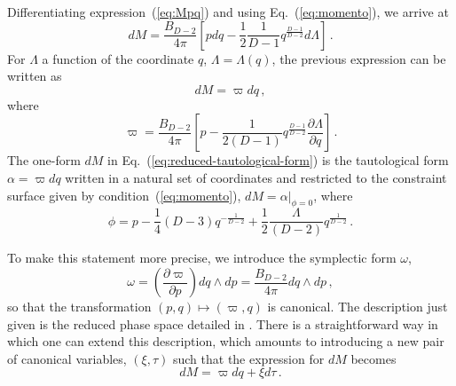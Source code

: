 \documentclass[prd,onecolumn,notitlepage,amsmath,nofootinbib,superscriptaddress,showpacs,showkeys]{revtex4-1}
\begin{document}
Differentiating expression~(\ref{eq:Mpq}) and using Eq.~(\ref{eq:momento}),
we arrive at 
\begin{equation}
dM=\frac{B_{D-2}}{4\pi}\left[pdq-\frac{1}{2}\frac{1}{D-1}q^{\frac{D-1}{D-2}}d\Lambda\right]\,.\label{dm2}
\end{equation}
For $\Lambda$ a function of the coordinate $q$, $\Lambda=\Lambda\left(q\right)$,
the previous expression can be written as 
\begin{equation}
dM=\varpi dq\,,\label{eq:reduced-tautological-form}
\end{equation}
where 
\begin{equation}
\varpi=\frac{B_{D-2}}{4\pi}\left[p-\frac{1}{2\left(D-1\right)}q^{\frac{D-1}{D-2}}\frac{\partial\Lambda}{\partial q}\right]\,.\label{eq:varpi}
\end{equation}
The one-form $dM$ in Eq.~(\ref{eq:reduced-tautological-form}) is
the tautological form $\alpha=\varpi dq$ written in a natural set
of coordinates and restricted to the constraint surface given by condition~(\ref{eq:momento}),
$dM=\left.\alpha\right|_{\phi=0}$, where 
\begin{equation}
\phi=p-\frac{1}{4}\left(D-3\right)q^{-\frac{1}{D-2}}+\frac{1}{2}\frac{\Lambda}{\left(D-2\right)}q^{\frac{1}{D-2}}\,.\label{eq:phi-constraint}
\end{equation}


To make this statement more precise, we introduce the symplectic form
$\omega$, 
\begin{equation}
\omega=\left(\frac{\partial\varpi}{\partial p}\right)dq\wedge dp=\frac{B_{D-2}}{4\pi}dq\wedge dp\,,\label{eq:reduced-symplectic}
\end{equation}
so that the transformation $\left(p,q\right)\mapsto\left(\varpi,q\right)$
is canonical. The description just given is the reduced phase space
detailed in \cite{baldfresmol2016}. There is a straightforward way
in which one can extend this description, which amounts to introducing
a new pair of canonical variables, $\left(\xi,\tau\right)$ such that
the expression for $dM$ becomes 
\begin{equation}
dM=\varpi dq+\xi d\tau\,.\label{eq:extended-tautological-form}
\end{equation}
\end{document}
